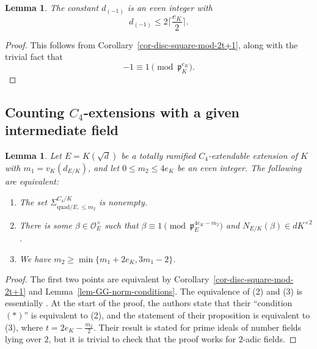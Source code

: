 \documentclass[11pt]{amsart}
\theoremstyle{theorem}
\newtheorem{lemma}[theorem]{Lemma}
\theoremstyle{example}
\theoremstyle{definition}
\numberwithin{theorem}{section}
\numberwithin{theorem}{section}
\newcommand{\co}{\mathcal{O}}
\newcommand{\p}{\mathfrak{p}}
\newcommand{\quadr}{\mathrm{quad}}
\begin{document}
\begin{lemma}
    \label{lem-bound-on-d-(-1)}
    The constant $d_{(-1)}$ is an even integer with
    $$
    d_{(-1)} \leq 2\Big\lceil \frac{e_K}{2}\Big\rceil. 
    $$
\end{lemma}
\begin{proof}
    This follows from Corollary~\ref{cor-disc-square-mod-2t+1}, along with the trivial fact that 
    $$
    -1 \equiv 1 \pmod{\p_K^{e_K}}.
    $$
\end{proof}

\subsection{Counting $C_4$-extensions with a given intermediate field}

\begin{lemma}
    \label{lem-conds-for-m2-extendable}
    Let $E = K(\sqrt{d})$ be a totally ramified $C_4$-extendable extension of $K$ with $m_1 = v_K(d_{E/K})$, and let $0 \leq m_2 \leq 4e_K$ be an even integer. The following are equivalent:
    \begin{enumerate}
        \item The set $\Sigma_{\quadr/E,\leq m_2}^{C_4/K}$ is nonempty. 
        \item There is some $\beta \in \co_E^\times$ such that $\beta \equiv 1\pmod{\p_E^{4e_K - m_2}}$ and $N_{E/K}(\beta) \in dK^{\times 2}$. 
        \item We have $m_2 \geq \min\{m_1 + 2e_K, 3m_1 - 2\}$. 
    \end{enumerate}
\end{lemma}
\begin{proof}
    The first two points are equivalent by Corollary~\ref{cor-disc-square-mod-2t+1} and Lemma~\ref{lem-GG-norm-conditions}. The equivalence of (2) and (3) is essentially \cite[Proposition 3.15]{cohen-et-al}. At the start of the proof, the authors state that their ``condition $(*)$'' is equivalent to (2), and the statement of their proposition is equivalent to (3), where $t = 2e_K - \frac{m_2}{2}$. Their result is stated for prime ideals of number fields lying over $2$, but it is trivial to check that the proof works for $2$-adic fields. 
\end{proof}
\end{document}
